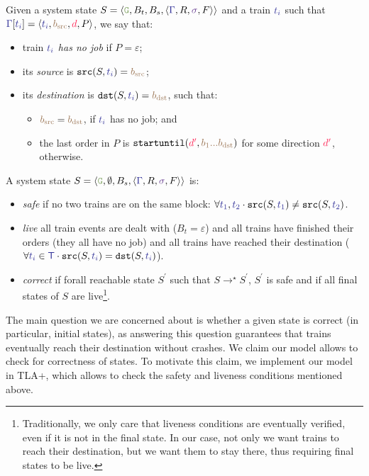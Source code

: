 \documentclass[runningheads]{llncs}
\newcommand{\tuple}[1]{\ensuremath{\langle #1\rangle}}
\newcommand{\dirFmt}[1]{{\color{dircolor} #1}}
\newcommand{\posFmt}[1]{{\color{poscolor}{#1}}}
\newcommand{\bid}[1]{\ensuremath{\posFmt{b_{#1}}}}
\newcommand{\swFmt}[1]{{\color{swcolor}{#1}}}
\newcommand{\switches}{\ensuremath{\swFmt{\sigma}}}
\newcommand{\trainFmt}[1]{{\color{traincolor} #1}}
\newcommand{\trainSeq}{\ensuremath{\trainFmt{\Gamma}}\xspace}
\newcommand{\trains}{{\trainFmt{\mathsf{T}}}}
\newcommand{\tid}[1]{\ensuremath{\trainFmt{t_{#1}}}}
\newcommand{\su}[2]{{\mbox{$\mathtt{startuntil}(\dirFmt{#1}, \posFmt{#2})$}}\xspace}
\newcommand{\emptyTrainProg}{\varepsilon}
\newcommand{\regulator}{\ensuremath{R}}
\newcommand{\signals}{\ensuremath{F}}
\newcommand{\stateTuple}[4]{\tuple{#1, #2, #3, #4}}
\newcommand{\guardFmt}[1]{{\color{guardcolor} \ensuremath{\mathtt{#1}}}}
\newcommand{\guardG}{\guardFmt{G}}
\newcommand{\bufferFmt}[1]{#1}
\newcommand{\emptyList}{\ensuremath{\varepsilon}}
\newcommand{\bufTrain}{\ensuremath{\bufferFmt{B_t}}\xspace}
\newcommand{\bufSig}{\ensuremath{\bufferFmt{B_s}}\xspace}
\newcommand{\reduces}{\ensuremath{\rightarrow}}
\newcommand{\redTuple}[4]{\ensuremath{\tuple{#1, \bufferFmt{#2}, \bufferFmt{#3}, #4}}}
\begin{document}
Given a system state  $S = \redTuple{\guardG}{\bufTrain}{\bufSig}{\stateTuple{\trainSeq{}}{\regulator}{\switches}{\signals}}$ and a train $\tid{i}$ such that $\trainSeq[\tid{i}] = \tuple{\tid{i}, \bid{\text{src}}, \dirFmt{d}, P}$, we say that:
\begin{itemize}
	\item train \tid{i} \emph{has no job} if $P = \emptyTrainProg$;
	\item its \emph{source} is $\mathtt{src}(S, \tid{i}) = \bid{\text{src}}$;
	\item its \emph{destination} is $\mathtt{dst}(S, \tid{i}) = \bid{\text{dst}}$, such that:
	\begin{itemize}
		\item $\bid{\text{src}} = \bid{\text{dst}}$, if \tid{i} has no job; and
		\item the last order in $P$ is $\su{d^\prime}{\bid{1}...\bid{\text{dst}}}$ for some direction $\dirFmt{d^\prime}$, otherwise.
	\end{itemize}
\end{itemize}

A system state $S = \redTuple{\guardG}{\emptyset}{\bufSig}{\stateTuple{\trainSeq{}}{\regulator}{\switches}{\signals}}$ is:
\begin{itemize}
	\item\emph{safe} if no two trains are on the same block: $\forall \tid{1}, \tid{2}\cdot \mathtt{src}(S, \tid{1}) \neq \mathtt{src}(S, \tid{2})$.
	\item\emph{live} all train events are dealt with ($\bufTrain = \emptyList$) and all trains have finished their orders (they all have no job) and all trains have reached their destination ($\forall \tid{i}\in\trains\cdot \mathtt{src}(S, \tid{i}) = \mathtt{dst}(S, \tid{i})$).
	\item \emph{correct} if forall reachable state $S^\prime$ such that $S\reduces^\star S^\prime$, $S^\prime$ is safe and if all final states of $S$ are live\footnote{Traditionally, we only care that liveness conditions are eventually verified, even if it is not in the final state. In our case, not only we want trains to reach their destination, but we want them to stay there, thus requiring final states to be live.}.
\end{itemize}

The main question we are concerned about is whether a given state is correct (in particular, initial states), as answering this question guarantees that trains eventually reach their destination without crashes. We claim our model allows to check for correctness of states. To motivate this claim, we implement our model in TLA+, which allows to check the safety and liveness conditions mentioned above.
\end{document}

